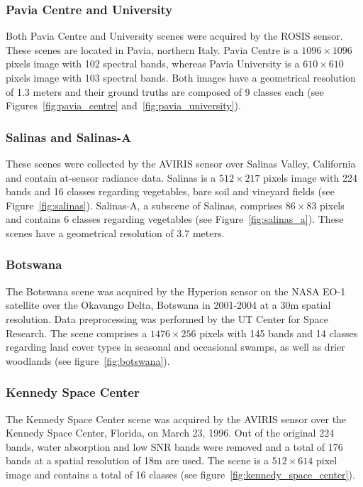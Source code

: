 \documentclass[parskip=full]{scrartcl}
\begin{document}
\subsubsection*{Pavia Centre and University}

Both Pavia Centre and University scenes were acquired by the ROSIS sensor. These
scenes are located in Pavia, northern Italy. Pavia Centre is a $1096 \times
1096$ pixels image with 102 spectral bands, whereas Pavia University is a $610
\times 610$ pixels image with 103 spectral bands.  Both images have a
geometrical resolution of 1.3 meters and their ground truths are composed of 9
classes each (see Figures~\ref{fig:pavia_centre}
and~\ref{fig:pavia_university}).

\subsubsection*{Salinas and Salinas-A}

These scenes were collected by the AVIRIS sensor over Salinas Valley, California
and contain at-sensor radiance data. Salinas is a $512 \times 217$ pixels image
with 224 bands and 16 classes regarding vegetables, bare soil and vineyard
fields (see Figure~\ref{fig:salinas}). Salinas-A, a subscene of Salinas,
comprises $86 \times 83$ pixels and contains 6 classes regarding vegetables (see
Figure~\ref{fig:salinas_a}). These scenes have a geometrical resolution of 3.7
meters.

\subsubsection*{Botswana}

The Botswana scene was acquired by the Hyperion sensor on the NASA EO-1
satellite over the Okavango Delta, Botswana in 2001-2004 at a 30m spatial
resolution. Data preprocessing was performed by the UT Center for Space
Research. The scene comprises a $1476 \times 256$ pixels with 145 bands and 14
classes regarding land cover types in seasonal and occasional swamps, as well as
drier woodlands (see figure~\ref{fig:botswana}).

\subsubsection*{Kennedy Space Center}

The Kennedy Space Center scene was acquired by the AVIRIS sensor over the
Kennedy Space Center, Florida, on March 23, 1996. Out of the original 224 bands,
water absorption and low SNR bands were removed and a total of 176 bands at a
spatial resolution of 18m are used. The scene is a $512 \times 614$ pixel image
and contains a total of 16 classes (see figure~\ref{fig:kennedy_space_center}).
\end{document}
